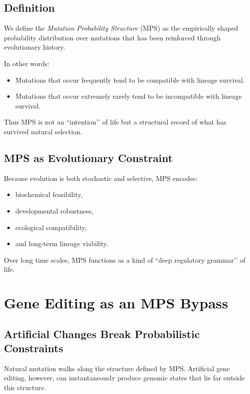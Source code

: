 \documentclass[11pt]{article}
\begin{document}
\subsection{Definition}

We define the \textit{Mutation Probability Structure} (MPS) as the empirically shaped probability distribution over mutations that has been reinforced through evolutionary history.

In other words:
\begin{itemize}
    \item Mutations that occur frequently tend to be compatible with lineage survival.
    \item Mutations that occur extremely rarely tend to be incompatible with lineage survival.
\end{itemize}

Thus MPS is not an ``intention’’ of life but a structural record of what has survived natural selection.

\subsection{MPS as Evolutionary Constraint}

Because evolution is both stochastic and selective, MPS encodes:

\begin{itemize}
    \item biochemical feasibility,
    \item developmental robustness,
    \item ecological compatibility,
    \item and long-term lineage viability.
\end{itemize}

Over long time scales, MPS functions as a kind of ``deep regulatory grammar’’ of life.

\section{Gene Editing as an MPS Bypass}

\subsection{Artificial Changes Break Probabilistic Constraints}

Natural mutation walks along the structure defined by MPS. Artificial gene editing, however, can instantaneously produce genomic states that lie far outside this structure.
\end{document}
